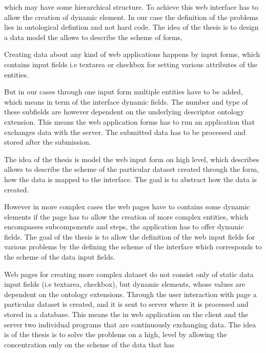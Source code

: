 which may have some hierarchical structure. To achieve this web interface has to allow the creation of dynamic element. In our case the definition of the problems lies in ontological defintion and not hard code. The idea of the thesis is to design a data model the allows to describe the scheme of forms, 


Creating data about any kind of  web applications happens by input forms, which contains input fields i.e textarea or checkbox for setting various attributes of the entities.


 But in our cases through one input form multiple entities have to be added, which means in term of the interface dynamic fields. The number and type of these subfields are however dependent on the underlying descriptor ontology extension. This means the web application forms has to run an application that exchanges data with the server. The submitted data has to be processed and stored after the submission. 

The idea of the thesis is model the web input form on high level, which describes allows to describe the scheme of the particular dataset created through the form, how the data is mapped to the interface. The goal is to abstract how the data is created.





 
 
 However in more complex cases the web pages have to contains some dynamic elements if the page has to allow the creation of more complex entities, which encompasses subcomponents and steps, the application has to offer dynamic fields. The goal of the thesis is to allow the definition of the web input fields for various problems by the defining the scheme of the interface which corresponds to the scheme of the data input fields.





Web pages for creating more complex dataset do not consist only of static data input fields (i.e textarea, checkbox), but dynamic elements, whose values are dependent on the ontology extensions. Through the user interaction with page a particular dataset is created, and it is sent to server where it is processed and stored in a database. This means the in web application on the client and the server two individual programs that are continuously exchanging data. The idea is of the thesis is to solve the problems on a high, level by allowing the concentration only on the scheme of the data that has 


